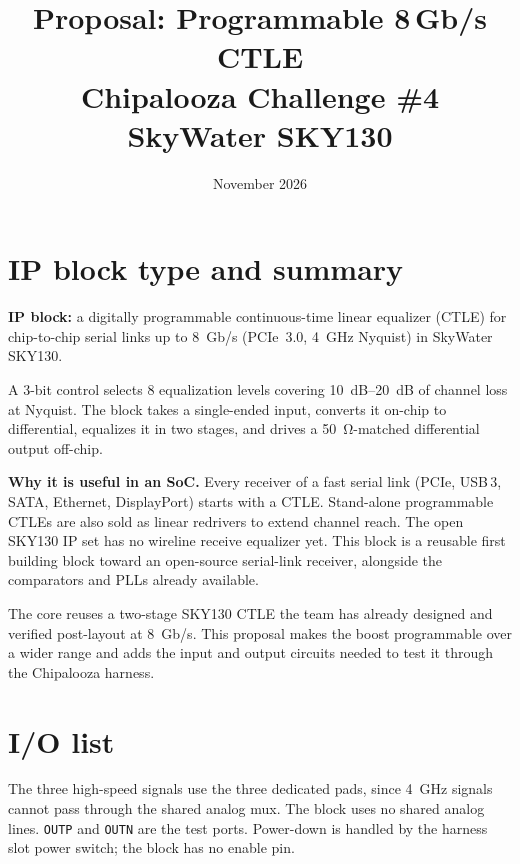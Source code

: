 \documentclass[11pt,a4paper]{article}
\title{\textbf{Proposal: Programmable 8\,Gb/s CTLE}\\[4pt]
\large Chipalooza Challenge \#4 \textperiodcentered{} SkyWater SKY130}
\author{}
\date{November 2026}
\newcommand{\pin}[1]{\texttt{#1}}
\begin{document}
\maketitle

\section{IP block type and summary}

\textbf{IP block:} a digitally programmable continuous-time linear
equalizer (CTLE) for chip-to-chip serial links up to \SI{8}{Gb/s}
(PCIe~3.0, \SI{4}{GHz} Nyquist) in SkyWater SKY130.

A 3-bit control selects 8 equalization levels covering \SIrange{10}{20}{dB}
of channel loss at Nyquist. The block takes a single-ended input, converts it
on-chip to differential, equalizes it in two stages, and drives a
\SI{50}{\ohm}-matched differential output off-chip.

\textbf{Why it is useful in an SoC.} Every receiver of a fast serial link
(PCIe, USB\,3, SATA, Ethernet, DisplayPort) starts with a CTLE. Stand-alone
programmable CTLEs are also sold as linear redrivers to extend channel
reach. The open SKY130 IP set has no wireline receive equalizer yet. This
block is a reusable first building block toward an open-source serial-link
receiver, alongside the comparators and PLLs already available.

The core reuses a two-stage SKY130 CTLE the team
has already designed and verified post-layout at \SI{8}{Gb/s}. This
proposal makes the boost programmable over a wider range and adds the input
and output circuits needed to test it through the Chipalooza harness.

\section{I/O list}

The three high-speed signals use the three dedicated pads, since
\SI{4}{GHz} signals cannot pass through the shared analog mux. The block uses
no shared analog lines. \pin{OUTP} and \pin{OUTN} are the test ports.
Power-down is handled by the harness slot power switch; the block has no
enable pin.
\end{document}
